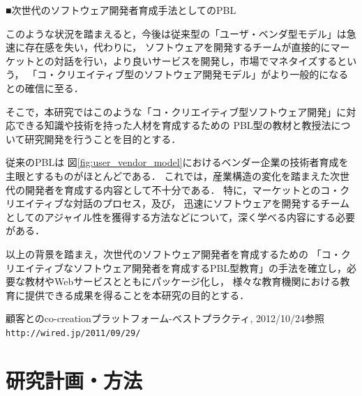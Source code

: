 \documentclass[11pt,a4paper,twoside]{jarticle}
\newcommand{\研究種別}{A}	%
\newcommand{\研究課題名}{コ・クリエイティブなソフトウェア開発者を育成するPBL型教育}
\newcommand{\研究機関名}{産業技術大学院大学}
\newcommand{\研究代表者氏名}{中鉢　欣秀}
\newcommand{\研究代表者氏名ふりがな}{ちゅうばち　よしひで}
\newcommand{\本応募effort}{\KLEffort{18}}	%
\newcommand{\研究期間の最終元号年度}{27}	%
\begin{document}
{	\begin{flushleft}
		■次世代のソフトウェア開発者育成手法としてのPBL
	\end{flushleft}

    このような状況を踏まえると，今後は従来型の「ユーザ・ベンダ型モデル」は急速に存在感を失い，代わりに，
    ソフトウェアを開発するチームが直接的にマーケットとの対話を行い，より良いサービスを開発し，市場でマネタイズするという，
    「コ・クリエイティブ型のソフトウェア開発モデル」がより一般的になるとの確信に至る．
    
    そこで，本研究ではこのような「コ・クリエイティブ型ソフトウェア開発」に対応できる知識や技術を持った人材を育成するための
    PBL型の教材と教授法について研究開発を行うことを目的とする．
    
    従来のPBLは
    図\ref{fig:user_vendor_model}におけるベンダー企業の技術者育成を主眼とするものがほとんどである．
    これでは，産業構造の変化を踏まえた次世代の開発者を育成する内容として不十分である．
    特に，マーケットとのコ・クリエイティブな対話のプロセス，及び，
    迅速にソフトウェアを開発するチームとしてのアジャイル性を獲得する方法などについて，深く学べる内容にする必要がある．
    
    以上の背景を踏まえ，次世代のソフトウェア開発者を育成するための
    「コ・クリエイティブなソフトウェア開発者を育成するPBL型教育」の手法を確立し，必要な教材やWebサービスとともにパッケージ化し，
    様々な教育機関における教育に提供できる成果を得ることを本研究の目的とする．
    
    
	\vspace{1cm}
	\begin{thebibliography}{99}
		 顧客とのco-creationプラットフォーム-ベストプラクティ, 2012/10/24参照 \\
                        \tt{http://wired.jp/2011/09/29/}
	\end{thebibliography}
}

\section{研究計画・方法}
\newcommand{\研究計画と方法概要}{%
	研究全体はPDCAサイクル．
	
	Doの場所として，AIITのPBLと授業，SFC
	
	予想される成果は・・・
	電子書籍による教科書
	
	クラウドサービスを利用した，学習支援サービス
    最先端のAgile型ソフトウェア開発（Scrum）や，リーンスタートアップ等の最新の製品開発プロセス
    に基づき
    
}
\end{document}
